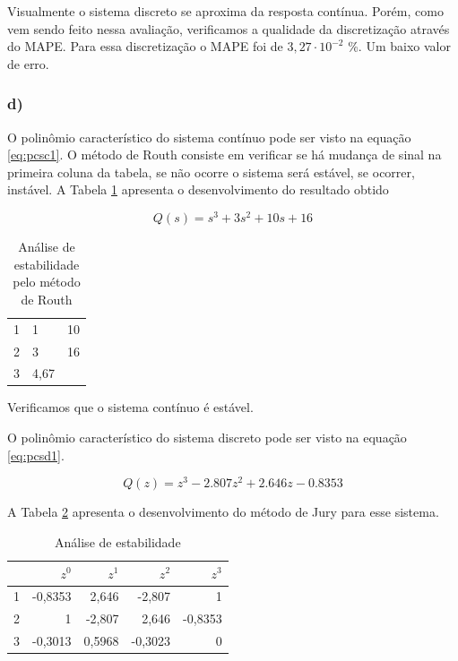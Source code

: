 Visualmente o sistema discreto se aproxima da resposta contínua. Porém, como vem sendo feito nessa 
avaliação, verificamos a qualidade da discretização através do MAPE. Para essa discretização o 
MAPE foi de $3,27 \cdot 10^{-2}$ \%. Um baixo valor de erro.

\subsubsection*{d)}

O polinômio característico do sistema contínuo pode ser visto na equação \ref{eq:pcsc1}. O método
de Routh consiste em verificar se há mudança de sinal na primeira coluna da tabela, se não ocorre
o sistema será estável, se ocorrer, instável. A Tabela \ref{tab:RE1} apresenta o desenvolvimento do
resultado obtido 

\begin{equation}
    Q(s) = s^3+3s^2+10s+16
    \label{eq:pcsc1}
\end{equation}

\begin{table}[!ht]
    \centering
    \vspace{0.5cm}
    \caption{Análise de estabilidade pelo método de Routh} 
    \begin{tabular}{r|lr}
        
        1 & 1 & 10 \\
        2 & 3 & 16 \\
        3 & 4{,}67\\
    \end{tabular}                
    \label{tab:RE1}
\end{table}

Verificamos que o sistema contínuo é estável.

O polinômio característico do sistema discreto pode ser visto na equação \ref{eq:pcsd1}.

\begin{equation}
    Q(z) = z^3 - 2.807 z^2 + 2.646 z - 0.8353
    \label{eq:pcsd1}
\end{equation}

A Tabela \ref{tab:JE1} apresenta o desenvolvimento do método de Jury para esse sistema.

\begin{table}[!ht]
    \centering
    \caption{Análise de estabilidade} 
    \begin{tabular}{l| r r r r}
         & $z^0$ & $z^1$ & $z^2$ & $z^3$\\
        \hline
        1 & -0{,}8353 & 2{,}646 & -2{,}807 & 1\\
        2 & 1 & -2{,}807 & 2{,}646 & -0{,}8353\\
        3 & -0{,}3013 & 0{,}5968 & -0{,}3023 & 0\\
    \end{tabular}                
    \label{tab:JE1}
\end{table}

